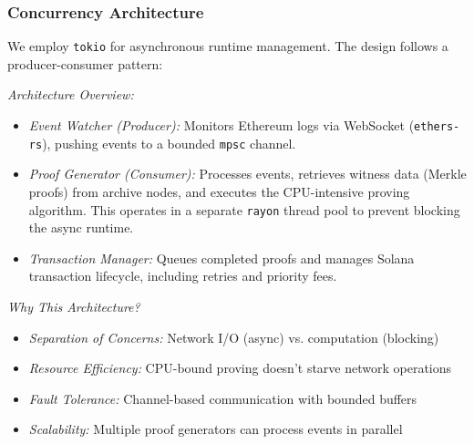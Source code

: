 \documentclass[11pt,a4paper]{article}
\begin{document}
\subsubsection{Concurrency Architecture}

We employ \texttt{tokio} for asynchronous runtime management. The design follows a producer-consumer pattern:

\textit{Architecture Overview:}
\begin{itemize}
    \item \textit{Event Watcher (Producer):} Monitors Ethereum logs via WebSocket (\texttt{ethers-rs}), pushing events to a bounded \texttt{mpsc} channel.
    \item \textit{Proof Generator (Consumer):} Processes events, retrieves witness data (Merkle proofs) from archive nodes, and executes the CPU-intensive proving algorithm. This operates in a separate \texttt{rayon} thread pool to prevent blocking the async runtime.
    \item \textit{Transaction Manager:} Queues completed proofs and manages Solana transaction lifecycle, including retries and priority fees.
\end{itemize}

\textit{Why This Architecture?}
\begin{itemize}
    \item \textit{Separation of Concerns:} Network I/O (async) vs. computation (blocking)
    \item \textit{Resource Efficiency:} CPU-bound proving doesn't starve network operations
    \item \textit{Fault Tolerance:} Channel-based communication with bounded buffers
    \item \textit{Scalability:} Multiple proof generators can process events in parallel
\end{itemize}
\end{document}
